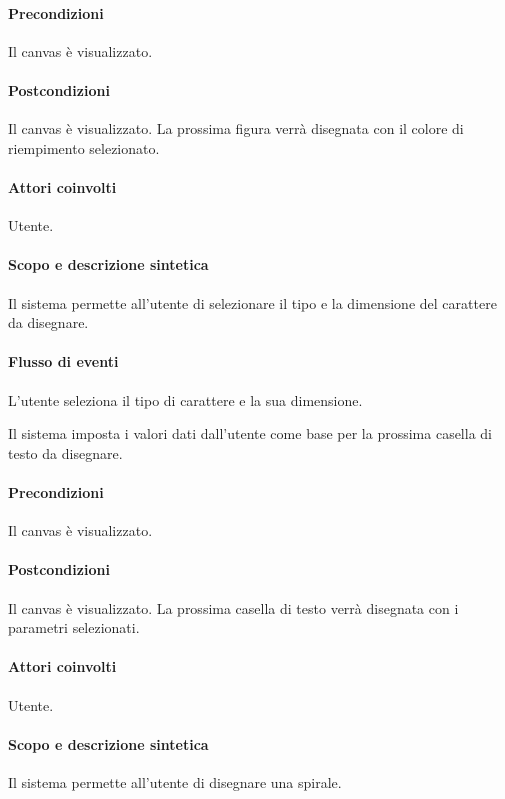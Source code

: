 \paragraph{Precondizioni} Il canvas \`e visualizzato.
\paragraph{Postcondizioni} Il canvas \`e visualizzato. La prossima figura verr\` a disegnata con il colore di riempimento selezionato.

\paragraph{Attori coinvolti} Utente.
\paragraph{Scopo e descrizione sintetica} 
Il sistema permette all'utente di selezionare il tipo e la dimensione del carattere da disegnare.
\paragraph{Flusso di eventi}
\begin{elenconumerato}[\textbf{}]{\subsubsecindent}
\item L'utente seleziona il tipo di carattere e la sua dimensione.
\item Il sistema imposta i valori dati dall'utente come base per la prossima casella di testo da disegnare.
\end{elenconumerato}
\paragraph{Precondizioni} Il canvas \`e visualizzato.
\paragraph{Postcondizioni} Il canvas \`e visualizzato. La prossima casella di testo verr\` a disegnata con i parametri selezionati.

\paragraph{Attori coinvolti} Utente.
\paragraph{Scopo e descrizione sintetica} 
Il sistema permette all'utente di disegnare una spirale.
